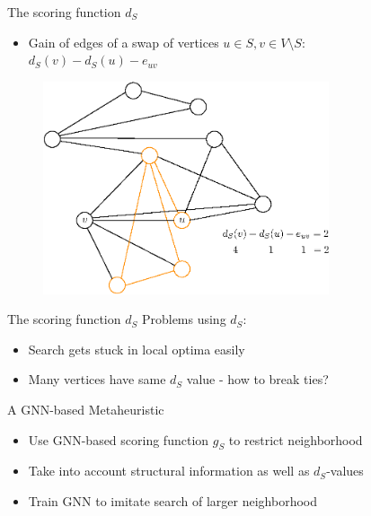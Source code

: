 \documentclass{beamer}
\begin{document}
\begin{frame}{The scoring function $d_S$}
    \begin{itemize}
        \item Gain of edges of a swap of vertices $u \in S, v \in V \setminus S$: \\
         $d_S(v) - d_S(u) - e_{uv}$
    \end{itemize}
    \begin{figure}
        \centering
        \includegraphics[width=0.75\textwidth]{graphics/ds1-1.eps}
    \end{figure}
\end{frame}

\begin{frame}{The scoring function $d_S$}
    Problems using $d_S$:
    \begin{itemize}
        \item<1-> Search gets stuck in local optima easily
        \item<2-> Many vertices have same $d_S$ value - how to break ties?
    \end{itemize}
\end{frame}

\begin{frame}{A GNN-based Metaheuristic}
    \begin{itemize}
        \item<1-> Use GNN-based scoring function $g_S$ to restrict neighborhood
        \item<2-> Take into account structural information as well as $d_S$-values
        \item<3-> Train GNN to imitate search of larger neighborhood
    \end{itemize}
\end{frame}
\end{document}
